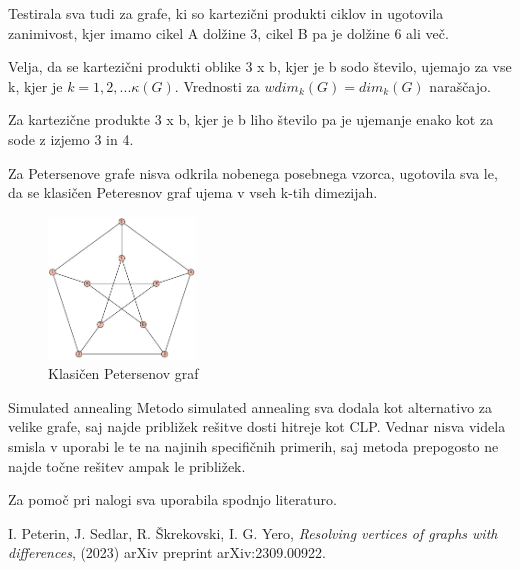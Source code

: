 \documentclass[12pt,a4paper]{amsart}
\makeatletter
\renewcommand\section{\@startsection{section}{1}%
  \z@{.5\linespacing\@plus.7\linespacing}{.5\linespacing}%
  {\normalfont\scshape\large\centering}}
\theoremstyle{plain} %
\makeatother
\begin{document}
Testirala sva tudi za grafe, ki so kartezični produkti ciklov in ugotovila zanimivost, kjer imamo cikel A dolžine 3, cikel B 
pa je dolžine 6 ali več.

Velja, da se kartezični produkti oblike 3 x b, kjer je b sodo število, ujemajo za vse k, kjer je
$k = 1, 2, ... \kappa(G)$. Vrednosti za $wdim_k(G)=dim_k(G)$ naraščajo.

Za kartezične produkte 3 x b, kjer je b liho število pa je ujemanje enako kot za sode z izjemo 3 in 4.

\bigskip
Za Petersenove grafe nisva odkrila nobenega posebnega vzorca, ugotovila sva le, da se klasičen Peteresnov graf
ujema v vseh k-tih dimezijah.

\begin{figure}[h]
    \centering
    \includegraphics[width=0.35\textwidth]{slike/petersen.png}
    \caption{Klasičen Petersenov graf}
    \label{fig:slika1}
\end{figure}

\section{Simulated annealing}
Metodo simulated annealing sva dodala kot alternativo za velike grafe, saj najde približek rešitve dosti hitreje kot CLP.
Vednar nisva videla smisla v uporabi le te na najinih specifičnih primerih, saj metoda prepogosto ne najde točne rešitev ampak le približek.

\bigskip

\bigskip
Za pomoč pri nalogi sva uporabila spodnjo literaturo.
\begin{thebibliography}{99}
    I. Peterin, J. Sedlar, R. Škrekovski, I. G. Yero,
    \emph{Resolving vertices of graphs with differences},
    (2023) arXiv preprint arXiv:2309.00922.
    \end{thebibliography}
\end{document}
